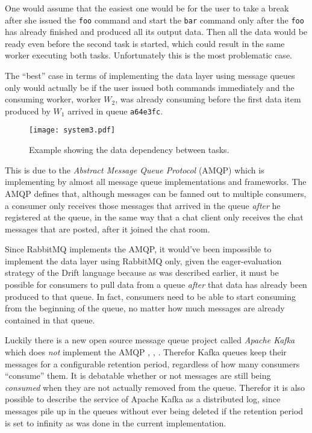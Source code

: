 One would assume that the easiest one would be for the user
to take a break after she issued the \texttt{foo} command and
start the \texttt{bar} command only after the \texttt{foo}
has already finished and produced all its output data.
Then all the data would be ready even before the second task
is started, which could result in the same worker executing
both tasks. Unfortunately this is the most problematic case.

The ``best'' case in terms of implementing the data layer
using message queues only would actually be if the user
issued both commands immediately and the consuming worker,
worker $W_{2}$, was already consuming before the first data
item produced by $W_{1}$ arrived in queue \texttt{a64e3fc}.

\begin{figure}[h]
  \texttt{[image: system3.pdf]}
  \caption{Example showing the data dependency between tasks.}
  \label{system3}
\end{figure}

This is due to the \textit{Abstract Message Queue Protocol}
(AMQP) which is implementing by almost all message queue
implementations and frameworks. The AMQP defines that,
although messages can be fanned out to multiple consumers,
a consumer only receives those messages that arrived in the
queue \textit{after} he registered at the queue, in the
same way that a chat client only receives the chat messages
that are posted, after it joined the chat room.

Since RabbitMQ implements the AMQP, it would've been impossible
to implement the data layer using RabbitMQ only, given the
eager-evaluation strategy of the Drift language because as was
described earlier, it must be possible for consumers to pull
data from a queue \textit{after} that data has already been
produced to that queue. In fact, consumers need to be able
to start consuming from the beginning of the queue, no matter
how much messages are already contained in that queue.

Luckily there is a new open source message queue project called
\textit{Apache Kafka} which does \textit{not} implement the AMQP
\cite{kafka}, \cite{kafkapaper}, \cite{kafkabook}.
Therefor Kafka queues keep their messages for a configurable
retention period, regardless of how many consumers ``consume''
them. It is debatable whether or not messages are still being
\textit{consumed} when they are not actually removed from the
queue. Therefor it is also possible to describe the service of
Apache Kafka as a distributed log, since messages pile up in
the queues without ever being deleted if the retention period
is set to infinity as was done in the current implementation.
\newline

